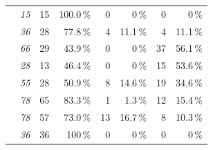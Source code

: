 {\begin{table}
\begin{tabular}{p{1.1cm}rrrrrrr}
	\jumper & \textit{15} &
	\cellcolor{lt-color!100!white}15 & \cellcolor{lt-color!100!white}100.0\,\% & 
	0 & 0\,\% & 
	0 & 0\,\%\\
	
	\kanzi & \textit{36} &
	\cellcolor{lt-color!78!white}28 & \cellcolor{lt-color!78!white}77.8\,\% & 
	\cellcolor{xmt-color!11!white}	4& \cellcolor{xmt-color!11!white}11.1\,\% & 
	\cellcolor{nmt-color!11!white}4 & \cellcolor{nmt-color!11!white}11.1\,\%\\
	
	\dconvert & \textit{66} &
	\cellcolor{lt-color!43!white}29 & \cellcolor{lt-color!43!white}43.9\,\% & 
	0 & 0\,\% & 
	\cellcolor{nmt-color!56!white}37 & \cellcolor{nmt-color!56!white}56.1\,\%\\
	
	\htwo & \textit{28} &
	\cellcolor{lt-color!47!white}13 & \cellcolor{lt-color!47!white}46.4\,\% & 
	0 & 0\,\% & 
	\cellcolor{nmt-color!53!white}15 & \cellcolor{nmt-color!53!white}53.6\,\%\\
	
	\batik & \textit{55} &
	\cellcolor{lt-color!50!white}28 & \cellcolor{lt-color!50!white}50.9\,\% & 
	\cellcolor{xmt-color!14!white}8 & \cellcolor{xmt-color!14!white}14.6\,\% & 
	\cellcolor{nmt-color!34!white}19 & \cellcolor{nmt-color!34!white}34.6\,\%\\
	
	
	\midrule
	
		\xz & \textit{78} &
	\cellcolor{lt-color!83!white}65 & \cellcolor{lt-color!83!white}83.3\,\% & 
	\cellcolor{xmt-color!1!white}1 & \cellcolor{xmt-color!1!white}1.3\,\% & 
	\cellcolor{nmt-color!15!white}12 & \cellcolor{nmt-color!16!white}15.4\,\%\\
	
		\lrzip & \textit{78} &
	\cellcolor{lt-color!73!white}57 & \cellcolor{lt-color!73!white}73.0\,\% & 
	\cellcolor{xmt-color!16!white}13 & \cellcolor{xmt-color!16!white}16.7\,\% & 
	\cellcolor{nmt-color!10!white}8 & \cellcolor{nmt-color!10!white}10.3\,\%\\
	
	\xzwo & \textit{36} &
	\cellcolor{lt-color!100!white}36 & \cellcolor{lt-color!100!white}100\,\% & 
	0 & 0\,\% & 
	0 & 0\,\%\\
	

\end{tabular}
\end{table}}
